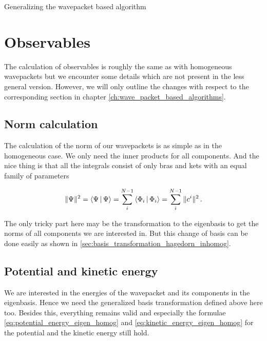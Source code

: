 \begin{chapter}{Generalizing the wavepacket based algorithm}
\section{Observables}

The calculation of observables is roughly the same as with homogeneous wavepackets
but we encounter some details which are not present in the less general version.
However, we will only outline the changes with respect to the corresponding
section in chapter \ref{ch:wave_packet_based_algorithms}.

\subsection{Norm calculation}

The calculation of the norm of our wavepackets is as simple as in the homogeneous
case. We only need the inner products for all components. And the nice thing is
that all the integrals consist of only bras and kets with an equal family of parameters

\begin{equation}
  \| \Psi \|^2  = \Braket{\Psi|\Psi} = \sum_i^{N-1} \Braket{\Phi_i | \Phi_i} = \sum_i^{N-1} \| c^i \|^2 \,.
\end{equation}

The only tricky part here may be the transformation to the eigenbasis to get the
norms of all components we are interested in. But this change of basis can be
done easily as shown in \ref{sec:basis_transformation_hagedorn_inhomog}.

\subsection{Potential and kinetic energy}

We are interested in the energies of the wavepacket and its components in the
eigenbasis. Hence we need the generalized basis transformation defined above here too. Besides
this, everything remains valid and especially the formulae \eqref{eq:potential_energy_eigen_homog}
and \eqref{eq:kinetic_energy_eigen_homog} for the potential and the kinetic energy still hold.

\end{chapter}